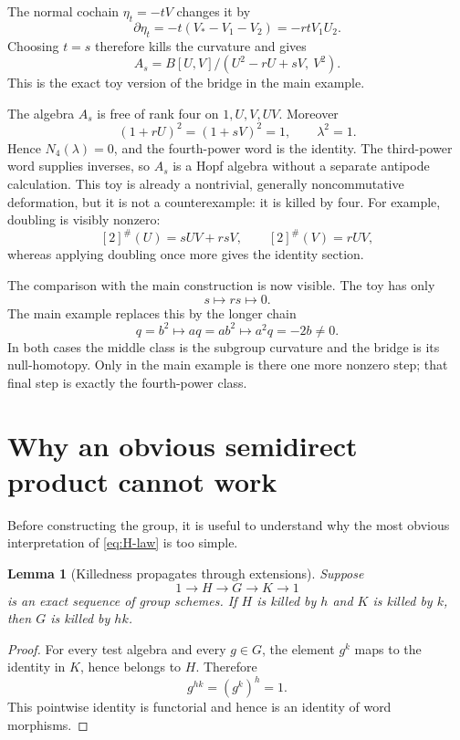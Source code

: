 \documentclass[11pt]{amsart}
\newtheorem{lemma}[theorem]{Lemma}
\theoremstyle{definition}
\theoremstyle{remark}
\begin{document}
The normal cochain \(\eta_t=-tV\) changes it by
\[
 \partial\eta_t
 =-t(V_*-V_1-V_2)
 =-rtV_1U_2.
\]
Choosing \(t=s\) therefore kills the curvature and gives
\begin{equation}\label{eq:toy-successful-bridge}
 A_s=B[U,V]/(U^2-rU+sV,\ V^2).
\end{equation}
This is the exact toy version of the bridge in the main example.

The algebra \(A_s\) is free of rank four on \(1,U,V,UV\).  Moreover
\[
 (1+rU)^2=(1+sV)^2=1,
 \qquad \lambda^2=1.
\]
Hence \(N_4(\lambda)=0\), and the fourth-power word is the identity.
The third-power word supplies inverses, so \(A_s\) is a Hopf algebra
without a separate antipode calculation.  This toy is already a
nontrivial, generally noncommutative deformation, but it is not a
counterexample: it is killed by four.
For example, doubling is visibly nonzero:
\[
 [2]^\#(U)=sUV+rsV,\qquad
 [2]^\#(V)=rUV,
\]
whereas applying doubling once more gives the identity section.

The comparison with the main construction is now visible.  The toy has
only
\[
 s\longmapsto rs\longmapsto0.
\]
The main example replaces this by the longer chain
\[
 q=b^2\longmapsto aq=ab^2
 \longmapsto a^2q=-2b\ne0.
\]
In both cases the middle class is the subgroup curvature and the bridge
is its null-homotopy.  Only in the main example is there one more
nonzero step; that final step is exactly the fourth-power class.

\section{Why an obvious semidirect product cannot work}
\label{sec:no-go}

Before constructing the group, it is useful to understand why the most
obvious interpretation of \eqref{eq:H-law} is too simple.

\begin{lemma}[Killedness propagates through extensions]
\label{lem:extension-no-go}
Suppose
\[
 1\longrightarrow H\longrightarrow G\longrightarrow K\longrightarrow1
\]
is an exact sequence of group schemes.  If \(H\) is killed by \(h\) and
\(K\) is killed by \(k\), then \(G\) is killed by \(hk\).
\end{lemma}

\begin{proof}
For every test algebra and every \(g\in G\), the element \(g^k\) maps to
the identity in \(K\), hence belongs to \(H\).  Therefore
\[
 g^{hk}=(g^k)^h=1.
\]
This pointwise identity is functorial and hence is an identity of word
morphisms.
\end{proof}
\end{document}
